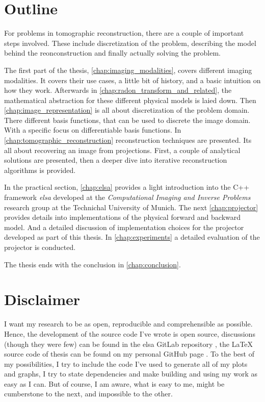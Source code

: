 \section{Outline}\label{sec:outline}

For problems in tomographic reconstruction, there are a couple of important steps involved. These
include discretization of the problem, describing the model behind the reonconstruction and finally
actually solving the problem.

The first part of the thesis, \autoref{chap:imaging_modalities}, covers different imaging
modalities. It covers their use cases, a little bit of history, and a basic intuition on how they
work. Afterwards in \autoref{chap:radon_transform_and_related}, the mathematical abstraction for
these different physical models is laied down. Then \autoref{chap:image_representation} is all about
discretization of the problem domain. There different basis functions, that can be used to discrete
the image domain. With a specific focus on differentiable basis functions. In
\autoref{chap:tomographic_reconstruction} reconstruction techniques are presented. Its all about
recovering an image from projections. First, a couple of analytical solutions are presented, then a
deeper dive into iterative reconstruction algorithms is provided.

In the practical section, \autoref{chap:elsa} provides a light introduction into the C++ framework
\textit{elsa} developed at the \textit{Computational Imaging and Inverse Problems} research group at
the Technichal University of Munich. The next \autoref{chap:projector} provides details into
implementations of the physical forward and backward model. And a detailed discussion of
implementation choices for the projector developed as part of this thesis. In
\autoref{chap:experiments} a detailed evaluation of the projector is conducted.

The thesis ends with the conclusion in \autoref{chap:conclusion}.

\section{Disclaimer}\label{sec:disclaimer}

I want my research to be as open, reproducible and comprehensible as possible. Hence, the
development of the source code I've wrote is open source, discussions (though they were few) can be
found in the elsa GitLab repository , the \LaTeX{} source code of thesis
can be found on my personal GitHub page . To the best of my
possibilities, I try to include the code I've used to generate all of my plots and graphs, I try to
state dependencies and make building and using my work as easy as I can. But of course, I am aware,
what is easy to me, might be cumberstone to the next, and impossible to the other.

